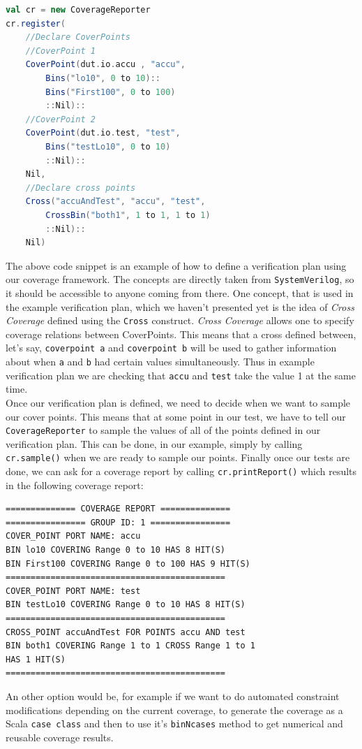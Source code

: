 \documentclass[conference]{IEEEtran}
\begin{document}
\begin{lstlisting}[language=scala]
val cr = new CoverageReporter
cr.register(
    //Declare CoverPoints
    //CoverPoint 1
    CoverPoint(dut.io.accu , "accu",
        Bins("lo10", 0 to 10)::
        Bins("First100", 0 to 100)
        ::Nil)::
    //CoverPoint 2
    CoverPoint(dut.io.test, "test", 
        Bins("testLo10", 0 to 10)
        ::Nil)::
    Nil,
    //Declare cross points
    Cross("accuAndTest", "accu", "test",
        CrossBin("both1", 1 to 1, 1 to 1)
        ::Nil)::
    Nil)
\end{lstlisting}
The above code snippet is an example of how to define a verification plan using our coverage framework. The concepts are directly taken from \texttt{SystemVerilog}, so it should be accessible to anyone coming from there. One concept, that is used in the example verification plan, which we haven't presented yet is the idea of \textit{Cross Coverage} defined using the \texttt{Cross} construct. \textit{Cross Coverage} allows one to specify coverage relations between CoverPoints. This means that a cross defined between, let's say, \texttt{coverpoint a} and \texttt{coverpoint b} will be used to gather information about when \texttt{a} and \texttt{b} had certain values simultaneously. Thus in example verification plan we are checking that \texttt{accu} and \texttt{test} take the value 1 at the same time.\\
Once our verification plan is defined, we need to decide when we want to sample our cover points. This means that at some point in our test, we have to tell our \texttt{CoverageReporter} to sample the values of all of the points defined in our verification plan. This can be done, in our example, simply by calling \texttt{cr.sample()} when we are ready to sample our points. Finally once our tests are done, we can ask for a coverage report by calling \texttt{cr.printReport()} which results in the following coverage report: 
\begin{verbatim}
============== COVERAGE REPORT ==============
================ GROUP ID: 1 ================
COVER_POINT PORT NAME: accu
BIN lo10 COVERING Range 0 to 10 HAS 8 HIT(S)
BIN First100 COVERING Range 0 to 100 HAS 9 HIT(S)
============================================
COVER_POINT PORT NAME: test
BIN testLo10 COVERING Range 0 to 10 HAS 8 HIT(S)
============================================
CROSS_POINT accuAndTest FOR POINTS accu AND test
BIN both1 COVERING Range 1 to 1 CROSS Range 1 to 1 
HAS 1 HIT(S)
============================================
\end{verbatim}
An other option would be, for example if we want to do automated constraint modifications depending on the current coverage, to generate the coverage as a Scala \texttt{case class} and then to use it's \texttt{binNcases} method to get numerical and reusable coverage results.  
  
\end{document}
